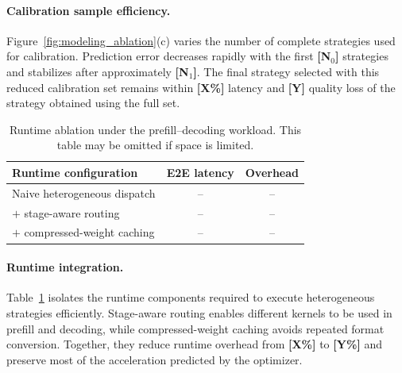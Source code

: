 \documentclass[letterpaper]{article} %
\begin{document}
\paragraph{Calibration sample efficiency.}
Figure~\ref{fig:modeling_ablation}(c) varies the number of complete strategies used for calibration. Prediction error decreases rapidly with the first \textbf{[N$_0$]} strategies and stabilizes after approximately \textbf{[N$_1$]}. The final strategy selected with this reduced calibration set remains within \textbf{[X\%]} latency and \textbf{[Y]} quality loss of the strategy obtained using the full set.

\begin{table}[t]
\centering
\caption{Runtime ablation under the prefill--decoding workload. This table may be omitted if space is limited.}
\label{tab:runtime_ablation}
\setlength{\tabcolsep}{4pt}
\begin{tabular}{lcc}
\toprule
Runtime configuration & E2E latency & Overhead \\
\midrule
Naive heterogeneous dispatch & -- & -- \\
$+$ stage-aware routing       & -- & -- \\
$+$ compressed-weight caching & -- & -- \\
\bottomrule
\end{tabular}
\end{table}

\paragraph{Runtime integration.}
Table~\ref{tab:runtime_ablation} isolates the runtime components required to execute heterogeneous strategies efficiently. Stage-aware routing enables different kernels to be used in prefill and decoding, while compressed-weight caching avoids repeated format conversion. Together, they reduce runtime overhead from \textbf{[X\%]} to \textbf{[Y\%]} and preserve most of the acceleration predicted by the optimizer.








\end{document}
